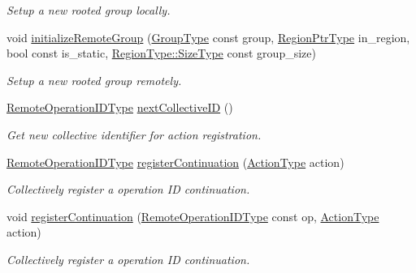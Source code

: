 \begin{DoxyCompactItemize}
\begin{DoxyCompactList}\small\item\em Setup a new rooted group locally. \end{DoxyCompactList}\item 
void \hyperlink{structvt_1_1group_1_1_group_manager_ae298a5917567082ed11c16cf66690cd3}{initialize\+Remote\+Group} (\hyperlink{namespacevt_a27b5e4411c9b6140c49100e050e2f743}{Group\+Type} const group, \hyperlink{structvt_1_1group_1_1_group_manager_a9192e585fc2f99bfd5a6ff65fc21c40b}{Region\+Ptr\+Type} in\+\_\+region, bool const is\+\_\+static, \hyperlink{structvt_1_1group_1_1region_1_1_region_a9bb381adf31111aae34dbc644bad6c1f}{Region\+Type\+::\+Size\+Type} const group\+\_\+size)
\begin{DoxyCompactList}\small\item\em Setup a new rooted group remotely. \end{DoxyCompactList}\item 
\hyperlink{namespacevt_1_1group_a73f2624ddeb535b39a08b6524f26b244}{Remote\+Operation\+I\+D\+Type} \hyperlink{structvt_1_1group_1_1_group_manager_ae8ccd9feb60fcd1ee85cc1f09ed003fb}{next\+Collective\+ID} ()
\begin{DoxyCompactList}\small\item\em Get new collective identifier for action registration. \end{DoxyCompactList}\item 
\hyperlink{namespacevt_1_1group_a73f2624ddeb535b39a08b6524f26b244}{Remote\+Operation\+I\+D\+Type} \hyperlink{structvt_1_1group_1_1_group_manager_aebb439bebdefc27cfa6408e5cf0f7741}{register\+Continuation} (\hyperlink{namespacevt_ae0a5a7b18cc99d7b732cb4d44f46b0f3}{Action\+Type} action)
\begin{DoxyCompactList}\small\item\em Collectively register a operation ID continuation. \end{DoxyCompactList}\item 
void \hyperlink{structvt_1_1group_1_1_group_manager_a0e67cdbacf259a8e4447bd3943dd6fdb}{register\+Continuation} (\hyperlink{namespacevt_1_1group_a73f2624ddeb535b39a08b6524f26b244}{Remote\+Operation\+I\+D\+Type} const op, \hyperlink{namespacevt_ae0a5a7b18cc99d7b732cb4d44f46b0f3}{Action\+Type} action)
\begin{DoxyCompactList}\small\item\em Collectively register a operation ID continuation. \end{DoxyCompactList}\item 

\end{DoxyCompactItemize}
